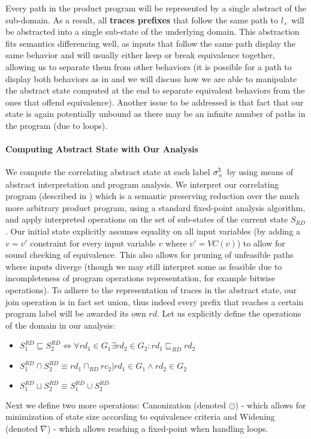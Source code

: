 Every path in the product program will be represented by a single abstract of the sub-domain. As a result, all \textbf{traces prefixes} that follow the same path to $l_{\times}$ will be abstracted into a single sub-state of the underlying domain. This abstraction fits semantics differencing well, as inputs that follow the same path display the same behavior and will usually either keep or break equivalence together, allowing us to separate them from other behaviors (it is possible for a path to display both behaviors as in  and we will discuss how we are able to manipulate the abstract state computed at the end to separate equivalent behaviors from the ones that offend equivalence). Another issue to be addressed is that fact that our state is again potentially unbound as there may be an infinite number of paths in the program (due to loops).

\paragraph{Computing Abstract State with Our Analysis} 
We compute the correlating abstract state at each label $\sigma_{\times}^\natural$ by using means of abstract interpretation and program analysis. We interpret our correlating program (described in ) which is a semantic preserving reduction over the much more arbitrary product program, using a standard fixed-point analysis algorithm, and apply interpreted operations on the set of sub-states of the current state $S_{RD}$. Our initial state explicitly assumes equality on all input variables (by adding a $v=v'$ constraint for every input variable $v$ where $v'=VC(v)$) to allow for sound checking of equivalence. This also allows for pruning of unfeasible paths where inputs diverge (though we may still interpret some as feasible due to incompleteness of program operations representation, for example bitwise operations). To adhere to the representation of traces in the abstract state, our join operation is in fact set union, thus indeed every prefix that reaches a certain program label will be awarded its own $rd$. Let us explicitly define the operations of the domain in our analysis:
\begin{itemize}
\item $S^{RD}_1 \sqsubseteq S^{RD}_2 \Longleftrightarrow \forall rd_1 \in G_1 \exists rd_2 \in G_2 : rd_1 \sqsubseteq_{RD} rd_2$
\item $S^{RD}_1 \sqcap S^{RD}_2 \equiv { rd_1 \sqcap_{RD} rc_2 | rd_1 \in G_1 \wedge rd_2 \in G_2}$
\item $S^{RD}_1 \sqcup S^{RD}_2 \equiv S^{RD}_1 \cup S^{RD}_2$
\end{itemize}
Next we define two more operations: Canonization (denoted $\odot$) - which allows for minimization of state size according to equivalence criteria and Widening (denoted $\nabla$) - which allows reaching a fixed-point when handling loops.

